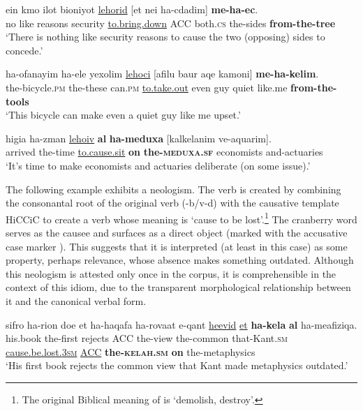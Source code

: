 \documentclass[output=paper]{langsci/langscibook}
\begin{document}
    \ea\label{ec-cause}
        \gll {\alef}ein kmo {\ayin}ilot bi{\tet}{\het}oniyot \underline{lehorid} [{\alef}et {\shin}nei ha-cdadim] \textbf{me-ha-{\ayin}ec}.\\
            no like reasons security \underline{to.bring.down} ACC both.\textsc{cs} the-sides \textbf{from-the-tree}\\
        \glt `There is nothing like security reasons to cause the two (opposing) sides to concede.'\\
    \z

	\ea\label{yaca-cause}
    	\gll ha-{\alef}ofanayim ha-{\alef}ele yexolim \underline{lehoci} [{\alef}afilu ba{\het}ur {\shin}aqe{\tet} kamoni] \textbf{me-ha-kelim}.\\
    	   the-bicycle.\textsc{pm} the-these can.\textsc{pm} \underline{to.take.out} even guy quiet like.me \textbf{from-the-tools}\\
    	\glt `This bicycle can make even a quiet guy like me upset.'
	\z

    \ea\label{meduxa-cause}
        \gll higi{\ayin}a ha-zman \underline{leho{\shin}iv} \textbf{{\ayin}al} \textbf{ha-meduxa} [kalkelanim ve-aq{\tet}u{\alef}arim].\\
            arrived the-time \underline{to.cause.sit} \textbf{on} \textbf{the-\textsc{meduxa}.\textsc{sf}} economists and-actuaries\\
        \glt `It's time to make economists and actuaries deliberate (on some issue).'
    \z

The following example exhibits a neologism. The verb  is created by combining the consonantal root of the original verb  ({\alef}-b/v-d) with the causative template HiCCiC to create a verb whose meaning is `cause to be lost'.\footnote{The original Biblical meaning of  is `demolish, destroy'.} The cranberry word  serves as the causee and surfaces as a direct object (marked with the accusative case marker ). This suggests that it is interpreted (at least in this case) as some property, perhaps relevance, whose absence makes something outdated. Although this neologism is attested only once in the corpus, it is comprehensible in the context of this idiom, due to the transparent morphological relationship between it and the canonical verbal form.

    \ea\label{kelax-cause}
        \gll sifro ha-ri{\shin}on do{\het}e {\alef}et ha-ha{\shin}qafa ha-rova{\het}at {\shin}e-qant \underline{he{\alef}evid} \underline{{\alef}et} \textbf{ha-kela{\het}} \textbf{{\ayin}al} ha-me{\tet}afiziqa.\\
            his.book the-first rejects ACC the-view the-common that-Kant.\textsc{sm} \underline{cause.be.lost.\textsc{3sm}} \underline{ACC} \textbf{the-\textsc{kelah}.\textsc{sm}} \textbf{on} the-metaphysics\\
        \glt `His first book rejects the common view that Kant made metaphysics outdated.'
    \z
\end{document}
